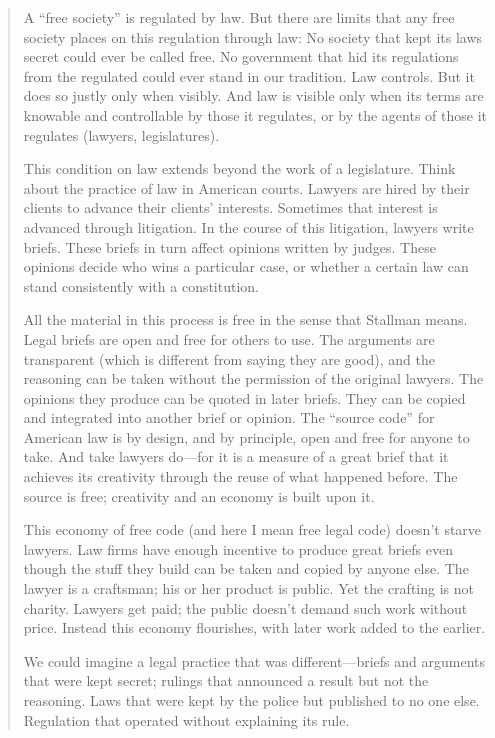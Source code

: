 \documentclass[11pt, letterpaper]{book}
\begin{document}
\begin{quotation}

A ``free society'' is regulated by law. But there are limits that any free
society places on this regulation through law: No society that kept its
laws secret could ever be called free. No government that hid its
regulations from the regulated could ever stand in our tradition. Law
controls. But it does so justly only when visibly. And law is visible
only when its terms are knowable and controllable by those it regulates,
or by the agents of those it regulates (lawyers, legislatures).

This condition on law extends beyond the work of a legislature. Think
about the practice of law in American courts. Lawyers are hired by their
clients to advance their clients' interests. Sometimes that interest is
advanced through litigation. In the course of this litigation, lawyers
write briefs. These briefs in turn affect opinions written by judges.
These opinions decide who wins a particular case, or whether a certain law
can stand consistently with a constitution.

All the material in this process is free in the sense that Stallman means.
Legal briefs are open and free for others to use. The arguments are
transparent (which is different from saying they are good), and the
reasoning can be taken without the permission of the original lawyers.
The opinions they produce can be quoted in later briefs. They can be
copied and integrated into another brief or opinion. The ``source code''
for American law is by design, and by principle, open and free for anyone
to take. And take lawyers do---for it is a measure of a great brief that
it achieves its creativity through the reuse of what happened before. The
source is free; creativity and an economy is built upon it.

This economy of free code (and here I mean free legal code) doesn't starve
lawyers. Law firms have enough incentive to produce great briefs even
though the stuff they build can be taken and copied by anyone else. The
lawyer is a craftsman; his or her product is public. Yet the crafting is
not charity. Lawyers get paid; the public doesn't demand such work
without price. Instead this economy flourishes, with later work added to
the earlier.

We could imagine a legal practice that was different---briefs and
arguments that were kept secret; rulings that announced a result but not
the reasoning. Laws that were kept by the police but published to no one
else. Regulation that operated without explaining its rule.


\end{quotation}
\end{document}
